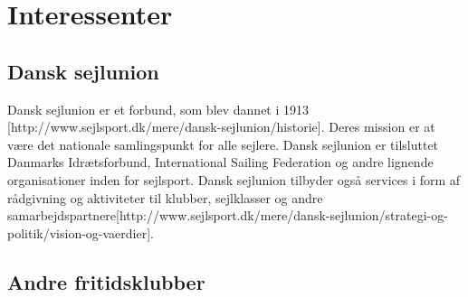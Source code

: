 \chapter{Interessenter}
\section{Dansk sejlunion}
Dansk sejlunion er et forbund, som blev dannet i 1913 [http://www.sejlsport.dk/mere/dansk-sejlunion/historie]. Deres mission er at være det nationale samlingspunkt for alle sejlere. Dansk sejlunion er tilsluttet Danmarks Idrætsforbund, International Sailing Federation og andre lignende organisationer inden for sejlsport. 
Dansk sejlunion tilbyder også services i form af rådgivning og aktiviteter til klubber, sejlklasser og andre samarbejdspartnere[http://www.sejlsport.dk/mere/dansk-sejlunion/strategi-og-politik/vision-og-vaerdier].

\section{Andre fritidsklubber}
